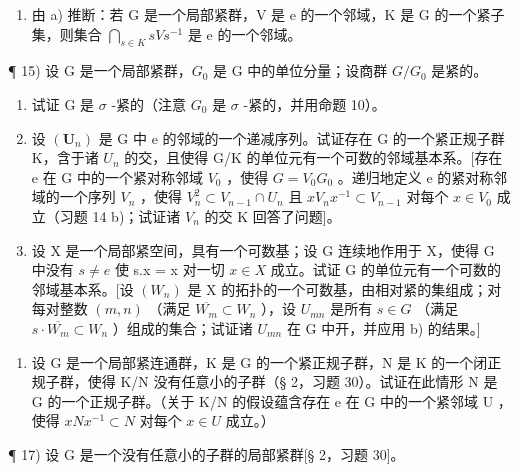 \begin{enumerate}
\def\labelenumi{\alph{enumi})}
\setcounter{enumi}{1}
\tightlist
\item
  由 a) 推断：若 G 是一个局部紧群，V 是 e 的一个邻域，K 是 G 的一个紧子集，则集合 \(\bigcap_{s\in K}sVs^{-1}\) 是 e 的一个邻域。
\end{enumerate}

¶ 15) 设 G 是一个局部紧群，\(G_{0}\) 是 G 中的单位分量；设商群 \(G/G_{0}\) 是紧的。

\begin{enumerate}
\def\labelenumi{\alph{enumi})}
\item
  试证 G 是 \(\sigma\) -紧的（注意 \(G_{0}\) 是 \(\sigma\) -紧的，并用命题 10）。
\item
  设 \((\mathbf{U}_{n})\) 是 G 中 e 的邻域的一个递减序列。试证存在 G 的一个紧正规子群 K，含于诸 \(U_{n}\) 的交，且使得 G/K 的单位元有一个可数的邻域基本系。{[}存在 e 在 G 中的一个紧对称邻域 \(V_{0}\) ，使得 \(G = V_{0}G_{0}\) 。递归地定义 e 的紧对称邻域的一个序列 \(V_{n}\) ，使得 \(V_{n}^{2} \subset V_{n-1} \cap U_{n}\) 且 \(xV_{n}x^{-1} \subset V_{n-1}\) 对每个 \(x \in V_{0}\) 成立（习题 14 b)；试证诸 \(V_{n}\) 的交 K 回答了问题{]}。
\item
  设 X 是一个局部紧空间，具有一个可数基；设 G 连续地作用于 X，使得 G 中没有 \(s \neq e\) 使 s.x = x 对一切 \(x \in X\) 成立。试证 G 的单位元有一个可数的邻域基本系。{[}设 \((W_n)\) 是 X 的拓扑的一个可数基，由相对紧的集组成；对每对整数 \((m, n)\) （满足 \(\overline{W_m} \subset W_n\) ），设 \(U_{mn}\) 是所有 \(s \in G\) （满足 \(s \cdot \overline{W_m} \subset W_n\) ）组成的集合；试证诸 \(U_{mn}\) 在 G 中开，并应用 b) 的结果。{]}
\end{enumerate}

\begin{enumerate}
\def\labelenumi{\arabic{enumi})}
\setcounter{enumi}{15}
\tightlist
\item
  设 G 是一个局部紧连通群，K 是 G 的一个紧正规子群，N 是 K 的一个闭正规子群，使得 K/N 没有任意小的子群（§ 2，习题 30）。试证在此情形 N 是 G 的一个正规子群。（关于 K/N 的假设蕴含存在 e 在 G 中的一个紧邻域 U ，使得 \(xNx^{-1} \subset N\) 对每个 \(x \in U\) 成立。）
\end{enumerate}

¶ 17) 设 G 是一个没有任意小的子群的局部紧群{[}§ 2，习题 30{]}。

